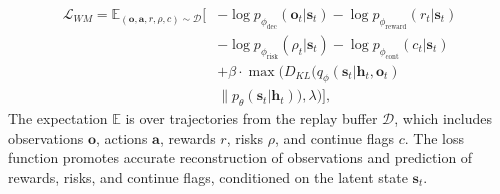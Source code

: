 



\begin{equation}
    \begin{split}
    \mathcal{L}_{WM} = \mathbb{E}_{(\mathbf{o}, \mathbf{a}, r, \rho, c) \sim \mathcal{D}} \Big[
    &-\log p_{\phi_{\text{dec}}}(\mathbf{o}_t | \mathbf{s}_t) 
    -\log p_{\phi_{\text{reward}}}(r_t | \mathbf{s}_t) \\
    &-\log p_{\phi_{\text{risk}}}(\rho_t | \mathbf{s}_t) 
    -\log p_{\phi_{\text{cont}}}(c_t | \mathbf{s}_t)  \\
    &+ \beta \cdot \max \Big( D_{KL} \big( q_{\phi}(\mathbf{s}_t | \mathbf{h}_{t}, \mathbf{o}_t) \\
    &  \big\| p_{\theta}(\mathbf{s}_t | \mathbf{h}_{t}) \big), \lambda \Big) \Big],
    \end{split}
    \label{eq:world_model_loss}
    \end{equation}
    The expectation $\mathbb{E}$ is over trajectories from the replay buffer $\mathcal{D}$, which includes observations $\mathbf{o}$, actions $\mathbf{a}$, rewards $r$, risks $\rho$, and continue flags $c$. The loss function promotes accurate reconstruction of observations and prediction of rewards, risks, and continue flags, conditioned on the latent state $\mathbf{s}_t$.

